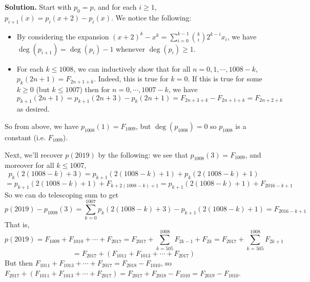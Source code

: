 \documentclass[11pt,a4paper]{article}
\newcommand{\<}{\langle}
\renewcommand{\>}{\rangle}
\begin{document}
\begin{enumerate}
	\textbf{Solution.}
	Start with $p_0=p$, and for each $i\ge 1$, $p_{i+1}(x)=p_{i}(x+2)-p_{i}(x)$. 
	We notice the following: 
	\begin{itemize}
		\item By considering the expansion $(x+2)^k-x^k = \sum_{i=0}^{k-1} \binom{k}{i}2^{k-i}x_i$, we have $\deg(p_{i+1})=\deg(p_i)-1$ whenever $\deg(p_i)\ge 1$. 
		
		\item For each $k\le 1008$, we can inductively show that for all $n=0, 1, \cdots, 1008-k$, 
		$p_k(2n+1)=F_{2n+1+k}$. 
		Indeed, this is true for $k=0$. 
		If this is true for some $k\ge 0$ (but $k\le 1007$) 
		then for $n=0, \cdots, 1007-k$, we have 
		\[
		p_{k+1}(2n+1)=p_{k+1}(2n+3)-p_{k}(2n+1)
		=F_{2n+3+k}-F_{2n+1+k}
		=F_{2n+2+k}
		\]
		as desired. 
	\end{itemize}
	So from above, we have $p_{1008}(1)=F_{1009}$, but $\deg(p_{1008})=0$ so $p_{1008}$ is a constant (i.e. $F_{1009}$). 
	
	Next, we'll recover $p(2019)$ by the following: we see that $p_{1008}(3)=F_{1009}$, and moreover for all $k\le 1007$, 
	\[
	p_k(2(1008-k)+3) = p_{k+1}(2(1008-k)+1)+p_k(2(1008-k)+1)
	\]\[
	=p_{k+1}(2(1008-k)+1)+F_{k+2(1008-k)+1}
	=p_{k+1}(2(1008-k)+1)+F_{2016-k+1}
	\]
	So we can do telescoping sum to get 
	\[
	p(2019)-p_{1008}(3)
	=\sum_{k=0}^{1007} p_k(2(1008-k)+3)-p_{k+1}(2(1008-k)+1)
	=F_{2016-k+1}
	\]
	That is, 
	\[
	p(2019)=F_{1009}+F_{1010}+\cdots + F_{2017}
	=F_{2017}+\sum_{k=505}^{1008}F_{2k-1}+F_{2k}
	=F_{2017}+\sum_{k=505}^{1008}F_{2k+1}
	\]\[
	=F_{2017}+(F_{1011}+F_{1013}+\cdots + F_{2017})
	\]
	But then $F_{1011}+F_{1013}+\cdots + F_{2017}=F_{2018}-F_{1010}$, so 
	$F_{2017}+(F_{1011}+F_{1013}+\cdots + F_{2017})=F_{2017}+F_{2018}-F_{1010}=F_{2019}-F_{1010}$. 
	
\end{enumerate}
\end{document}
